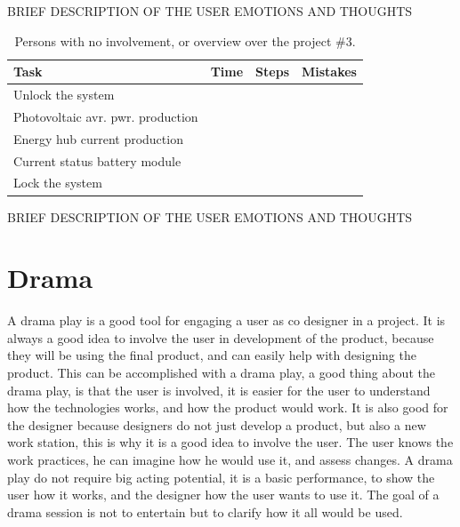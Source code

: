 BRIEF DESCRIPTION OF THE USER EMOTIONS AND THOUGHTS\\

\begin{table}[H]
\begin{tabular}{ | l | l | l | l |}
	\hline
	Task & Time & Steps & Mistakes \\ \hline
	Unlock the system & & & \\ \hline
	Photovoltaic avr. pwr. production & & & \\ \hline
	Energy hub current production & & & \\ \hline
	Current status battery module & & & \\ \hline
	Lock the system & & & \\ \hline
\end{tabular}
\caption{Persons with no involvement, or overview over the project \#3.}
\end{table}

BRIEF DESCRIPTION OF THE USER EMOTIONS AND THOUGHTS




\section{Drama}
A drama play is a good tool for engaging a user as co designer in a project. It is always a good idea to involve the user in development of the product, because they will be using the final product, and can easily help with designing the product. This can be accomplished with a drama play, a good thing about the drama play, is that the user is involved, it is easier for the user to understand how the technologies works, and how the product would work. It is also good for the designer because designers do not just develop a product, but also a new work station, this is why it is a good idea to involve the user. The user knows the work practices, he can imagine how he would use it, and assess changes. A drama play do not require big acting potential, it is a basic performance, to show the user how it works, and the designer how the user wants to use it. The goal of a drama session is not to entertain but to clarify how it all would be used.

